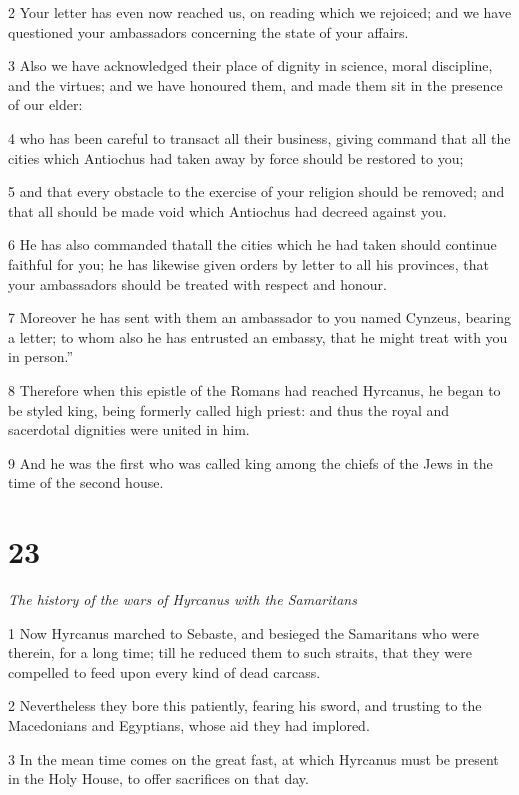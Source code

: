 2 Your letter has even now reached us, on reading which we rejoiced; and we have questioned your ambassadors concerning the state of your affairs. 

3 Also we have acknowledged their place of dignity in science, moral discipline, and the virtues; and we have honoured them, and made them sit in the presence of our elder: 

4 who has been careful to transact all their business, giving command that all the cities which Antiochus had taken away by force should be restored to you; 

5 and that every obstacle to the exercise of your religion should be removed; and that all should be made void which Antiochus had decreed against you. 

6 He has also commanded thatall the cities which he had taken should continue faithful for you; he has likewise given orders by letter to all his provinces, that your ambassadors should be treated with respect and honour. 

7 Moreover he has sent with them an ambassador to you named Cynzeus, bearing a letter; to whom also he has entrusted an embassy, that he might treat with you in person.” 

8 Therefore when this epistle of the Romans had reached Hyrcanus, he began to be styled king, being formerly called high priest: and thus the royal and sacerdotal dignities were united in him. 

9 And he was the first who was called king among the chiefs of the Jews in the time of the second house.


\chapter{23}

\par \textit{The history of the wars of Hyrcanus with the Samaritans}

1 Now Hyrcanus marched to Sebaste, and besieged the Samaritans who were therein, for a long time; till he reduced them to such straits, that they were compelled to feed upon every kind of dead carcass. 

2 Nevertheless they bore this patiently, fearing his sword, and trusting to the Macedonians and Egyptians, whose aid they had implored. 

3 In the mean time comes on the great fast, at which Hyrcanus must be present in the Holy House, to offer sacrifices on that day. 

